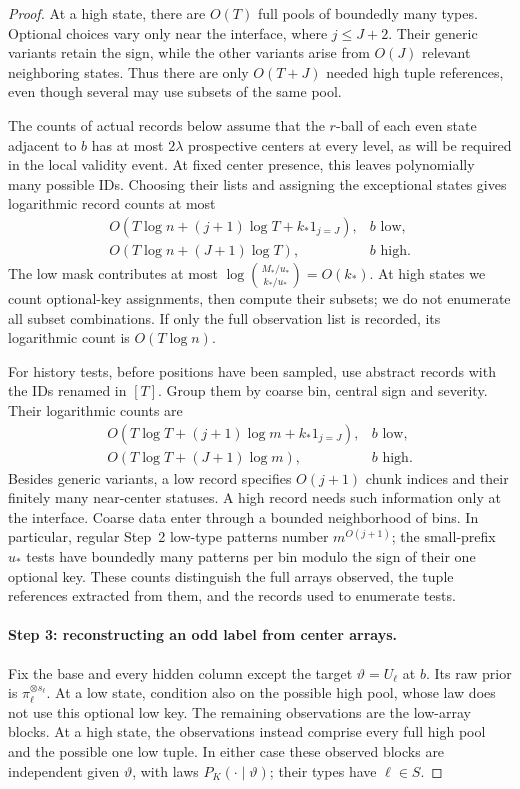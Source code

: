 \begin{proof}
At a high state, there are \(O(T)\) full pools of boundedly many types.
Optional choices vary only near the interface, where \(j\le J+2\).
Their generic variants retain the sign, while the other variants arise
from \(O(J)\) relevant neighboring states. Thus there are only
\(O(T+J)\) needed high tuple references, even though several may use
subsets of the same pool.

The counts of actual records below assume that the \(r\)-ball of each
even state adjacent to \(b\) has at most \(2\lambda\) prospective centers
at every level, as will be required in the local validity event.
At fixed center presence, this leaves polynomially
many possible IDs. Choosing their lists and assigning the exceptional
states gives logarithmic record counts at most
\[
 \begin{array}{ll}
 O(T\log n+(j+1)\log T+k_*1_{j=J}),&b\text{ low},\\
 O(T\log n+(J+1)\log T),&b\text{ high}.
 \end{array}
\]
The low mask contributes at most
\(\log\binom{M_*/u_*}{k_*/u_*}=O(k_*)\). At high states we count
optional-key assignments, then compute their subsets; we do not enumerate
all subset combinations. If only the full observation list is recorded,
its logarithmic count is \(O(T\log n)\).

For history tests, before positions have been sampled, use abstract
records with the IDs renamed in \([T]\). Group them by coarse bin,
central sign and severity. Their logarithmic counts are
\[
 \begin{array}{ll}
 O(T\log T+(j+1)\log m+k_*1_{j=J}),&b\text{ low},\\
 O(T\log T+(J+1)\log m),&b\text{ high}.
 \end{array}
\]
Besides generic variants, a low record specifies \(O(j+1)\) chunk
indices and their finitely many near-center statuses. A high record
needs such information only at the interface. Coarse data enter through
a bounded neighborhood of bins. In particular, regular Step~2 low-type
patterns number \(m^{O(j+1)}\); the small-prefix \(u_*\) tests have
boundedly many patterns per bin modulo the sign of their one optional
key. These counts distinguish the full arrays observed, the tuple
references extracted from them, and the records used to enumerate tests.

\paragraph{Step 3: reconstructing an odd label from center arrays.}
Fix the base and every hidden column except the target
\(\vartheta=U_\ell\) at \(b\). Its raw prior is
\(\pi_\ell^{\otimes s_\ell}\). At a low state, condition also on the
possible high pool, whose law does not use this optional low key. The
remaining observations are the low-array blocks. At a high state, the
observations instead comprise every full high pool and the possible one
low tuple. In either case these observed blocks are independent given
\(\vartheta\), with laws \(P_K(\cdot\mid\vartheta)\); their types
have \(\ell\in S\).


\end{proof}
